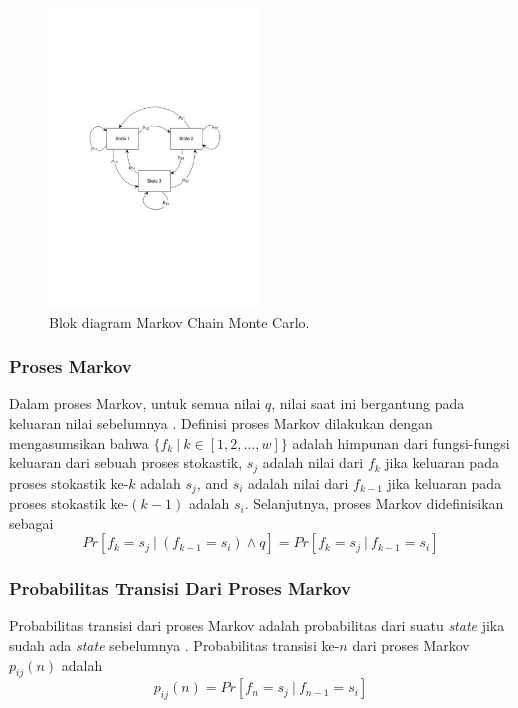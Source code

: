 {{{{{{\begin{figure}[!h]
	\centering
	\includegraphics[width=0.5\textwidth]{Fig/diagramMCMC}
	\caption{Blok diagram Markov Chain Monte Carlo.}
	\label{diagramMCMC}
\end{figure}

\subsubsection{Proses Markov}
Dalam proses Markov, untuk semua nilai $q$, nilai saat ini bergantung pada keluaran nilai sebelumnya \cite{Revuz1984}. Definisi proses Markov dilakukan dengan mengasumsikan bahwa $\{f_k\ |\ k \in [1,2,...,w]\}$ adalah himpunan dari fungsi-fungsi keluaran dari sebuah proses stokastik, $s_j$ adalah nilai dari $f_k$ jika keluaran pada proses stokastik ke-$k$ adalah $s_j$, and $s_i$ adalah nilai dari $f_{k-1}$ jika keluaran pada proses stokastik ke-$(k-1)$ adalah $s_i$. Selanjutnya, proses Markov didefinisikan sebagai 
\begin{equation}
Pr[f_k=s_j\ |\ (f_{k-1}=s_i)\wedge q]=Pr[f_k=s_j\ |\ f_{k-1}=s_i]\label{fmc}
\end{equation}
\subsubsection{Probabilitas Transisi Dari Proses Markov}
Probabilitas transisi dari proses Markov adalah probabilitas dari suatu \textit{state} jika sudah ada \textit{state} sebelumnya \cite{Revuz1984}. Probabilitas transisi ke-$n$ dari proses Markov $p_{ij}(n)$ adalah
\begin{equation}
p_{ij}(n)=Pr[f_n=s_j\ |\ f_{n-1}=s_i]\label{tp1}
\end{equation}
}}}}}}
